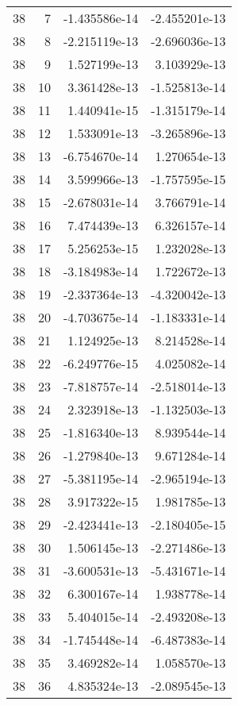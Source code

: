 \begin{tabular}{rrrr}
  38 &    7 & -1.435586e-14 & -2.455201e-13 \\
  38 &    8 & -2.215119e-13 & -2.696036e-13 \\
  38 &    9 &  1.527199e-13 &  3.103929e-13 \\
  38 &   10 &  3.361428e-13 & -1.525813e-14 \\
  38 &   11 &  1.440941e-15 & -1.315179e-14 \\
  38 &   12 &  1.533091e-13 & -3.265896e-13 \\
  38 &   13 & -6.754670e-14 &  1.270654e-13 \\
  38 &   14 &  3.599966e-13 & -1.757595e-15 \\
  38 &   15 & -2.678031e-14 &  3.766791e-14 \\
  38 &   16 &  7.474439e-13 &  6.326157e-14 \\
  38 &   17 &  5.256253e-15 &  1.232028e-13 \\
  38 &   18 & -3.184983e-14 &  1.722672e-13 \\
  38 &   19 & -2.337364e-13 & -4.320042e-13 \\
  38 &   20 & -4.703675e-14 & -1.183331e-14 \\
  38 &   21 &  1.124925e-13 &  8.214528e-14 \\
  38 &   22 & -6.249776e-15 &  4.025082e-14 \\
  38 &   23 & -7.818757e-14 & -2.518014e-13 \\
  38 &   24 &  2.323918e-13 & -1.132503e-13 \\
  38 &   25 & -1.816340e-13 &  8.939544e-14 \\
  38 &   26 & -1.279840e-13 &  9.671284e-14 \\
  38 &   27 & -5.381195e-14 & -2.965194e-13 \\
  38 &   28 &  3.917322e-15 &  1.981785e-13 \\
  38 &   29 & -2.423441e-13 & -2.180405e-15 \\
  38 &   30 &  1.506145e-13 & -2.271486e-13 \\
  38 &   31 & -3.600531e-13 & -5.431671e-14 \\
  38 &   32 &  6.300167e-14 &  1.938778e-14 \\
  38 &   33 &  5.404015e-14 & -2.493208e-13 \\
  38 &   34 & -1.745448e-14 & -6.487383e-14 \\
  38 &   35 &  3.469282e-14 &  1.058570e-13 \\
  38 &   36 &  4.835324e-13 & -2.089545e-13 \\

\end{tabular}
